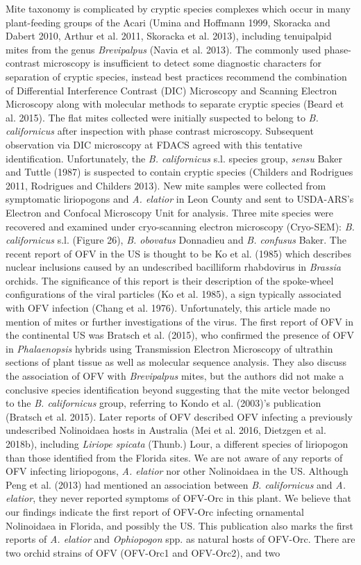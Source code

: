 \documentclass[12pt,final,CPage]{ufthesis}
\begin{document}
{  Mite taxonomy is complicated by cryptic species complexes which occur in many plant-feeding groups of the Acari (Umina and Hoffmann 1999, Skoracka and Dabert 2010, Arthur et al. 2011, Skoracka et al. 2013), including tenuipalpid mites from the genus \emph{Brevipalpus} (Navia et al. 2013). The commonly used phase-contrast microscopy is insufficient to detect some diagnostic characters for separation of cryptic species, instead best practices recommend the combination of Differential Interference Contrast (DIC) Microscopy and Scanning Electron Microscopy along with molecular methods to separate cryptic species (Beard et al. 2015). The flat mites collected were initially suspected to belong to \emph{B. californicus} after inspection with phase contrast microscopy. Subsequent observation via DIC microscopy at FDACS agreed with this tentative identification. Unfortunately, the \emph{B. californicus} s.l. species group, \emph{sensu} Baker and Tuttle (1987) is suspected to contain cryptic species (Childers and Rodrigues 2011, Rodrigues and Childers 2013). New mite samples were collected from symptomatic liriopogons and \emph{A. elatior} in Leon County and sent to USDA-ARS's Electron and Confocal Microscopy Unit for analysis. Three mite species were recovered and examined under cryo-scanning electron microscopy (Cryo-SEM): \emph{B. californicus} s.l. (Figure 26), \emph{B. obovatus} Donnadieu and \emph{B. confusus} Baker. The recent report of OFV in the US is thought to be Ko et al. (1985) which describes nuclear inclusions caused by an undescribed bacilliform rhabdovirus in \emph{Brassia} orchids. The significance of this report is their description of the spoke-wheel configurations of the viral particles (Ko et al. 1985), a sign typically associated with OFV infection (Chang et al. 1976). Unfortunately, this article made no mention of mites or further investigations of the virus. The first report of OFV in the continental US was Bratsch et al. (2015), who confirmed the presence of OFV in \emph{Phalaenopsis} hybrids using Transmission Electron Microscopy of ultrathin sections of plant tissue as well as molecular sequence analysis. They also discuss the association of OFV with \emph{Brevipalpus} mites, but the authors did not make a conclusive species identification beyond suggesting that the mite vector belonged to the \emph{B. californicus} group, referring to Kondo et al. (2003)'s publication (Bratsch et al. 2015). Later reports of OFV described OFV infecting a previously undescribed Nolinoidaea hosts in Australia (Mei et al. 2016, Dietzgen et al. 2018b), including \emph{Liriope spicata} (Thunb.) Lour, a different species of liriopogon than those identified from the Florida sites. We are not aware of any reports of OFV infecting liriopogons, \emph{A. elatior} nor other Nolinoidaea in the US. Although Peng et al. (2013) had mentioned an association between \emph{B. californicus} and \emph{A. elatior}, they never reported symptoms of OFV-Orc in this plant. We believe that our findings indicate the first report of OFV-Orc infecting ornamental Nolinoidaea in Florida, and possibly the US. This publication also marks the first reports of \emph{A. elatior} and \emph{Ophiopogon} spp. as natural hosts of OFV-Orc. There are two orchid strains of OFV (OFV-Orc1 and OFV-Orc2), and two }
\end{document}
